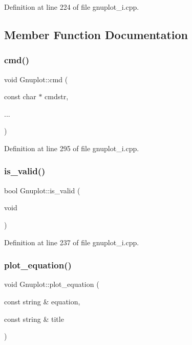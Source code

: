 Definition at line 224 of file gnuplot\+\_\+i.\+cpp.



\subsection{Member Function Documentation}
\mbox{\label{class_gnuplot_a6f299285af0a0ee2cf1722c469aa1a57}} 
\subsubsection{\texorpdfstring{cmd()}{cmd()}}
{\footnotesize\ttfamily void Gnuplot\+::cmd (\begin{DoxyParamCaption}\item[{const char $\ast$}]{cmdstr,  }\item[{}]{... }\end{DoxyParamCaption})}



Definition at line 295 of file gnuplot\+\_\+i.\+cpp.

\mbox{\label{class_gnuplot_a0daaf54cd8e41dbbd574722f3a831cfd}} 
\subsubsection{\texorpdfstring{is\+\_\+valid()}{is\_valid()}}
{\footnotesize\ttfamily bool Gnuplot\+::is\+\_\+valid (\begin{DoxyParamCaption}\item[{void}]{ }\end{DoxyParamCaption})}



Definition at line 237 of file gnuplot\+\_\+i.\+cpp.

\mbox{\label{class_gnuplot_a55e6430f1329bf8a66f155dcacb9d112}} 
\subsubsection{\texorpdfstring{plot\+\_\+equation()}{plot\_equation()}}
{\footnotesize\ttfamily void Gnuplot\+::plot\+\_\+equation (\begin{DoxyParamCaption}\item[{const string \&}]{equation,  }\item[{const string \&}]{title }\end{DoxyParamCaption})}



